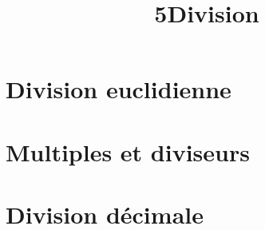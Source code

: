 \documentclass[12pt,a4paper]{article}
\date{}
\title{\textcircled{{\normalsize{5}}}Division}
\begin{document}
\maketitle








\section{Division euclidienne}






\section{Multiples et diviseurs}





\newpage

\section{Division décimale}



\end{document}
